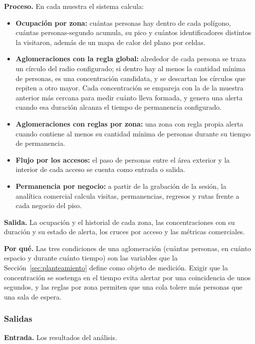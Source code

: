 \textbf{Proceso.} En cada muestra el sistema calcula:
\begin{itemize}[leftmargin=2.2em,itemsep=0.1em]
  \item \textbf{Ocupación por zona:} cuántas personas hay dentro de cada polígono, cuántas
  personas-segundo acumula, su pico y cuántos identificadores distintos la visitaron, además de
  un mapa de calor del plano por celdas.
  \item \textbf{Aglomeraciones con la regla global:} alrededor de cada persona se traza un círculo
  del radio configurado; si dentro hay al menos la cantidad mínima de personas, es una
  concentración candidata, y se descartan los círculos que repiten a otro mayor. Cada
  concentración se empareja con la de la muestra anterior más cercana para medir cuánto lleva
  formada, y genera una alerta cuando esa duración alcanza el tiempo de permanencia
  configurado.
  \item \textbf{Aglomeraciones con reglas por zona:} una zona con regla propia alerta cuando
  contiene al menos su cantidad mínima de personas durante su tiempo de permanencia.
  \item \textbf{Flujo por los accesos:} el paso de personas entre el área exterior y la interior de
  cada acceso se cuenta como entrada o salida.
  \item \textbf{Permanencia por negocio:} a partir de la grabación de la sesión, la analítica
  comercial calcula visitas, permanencias, regresos y rutas frente a cada negocio del piso.
\end{itemize}

\textbf{Salida.} La ocupación y el historial de cada zona, las concentraciones con su duración y
su estado de alerta, los cruces por acceso y las métricas comerciales.

\textbf{Por qué.} Las tres condiciones de una aglomeración (cuántas personas, en cuánto espacio
y durante cuánto tiempo) son las variables que la Sección~\ref{sec:planteamiento} define como
objeto de medición. Exigir que la concentración se sostenga en el tiempo evita alertar por una
coincidencia de unos segundos, y las reglas por zona permiten que una cola tolere más
personas que una sala de espera.

\subsubsection{Salidas}
\label{subsec:met-salidas}

\textbf{Entrada.} Los resultados del análisis.

